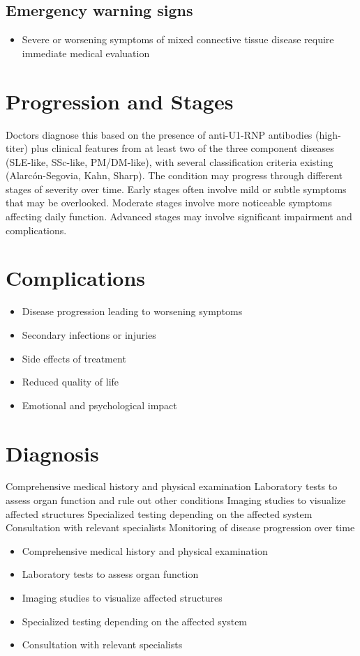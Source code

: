 \subsection{Emergency warning signs}
\begin{itemize}[noitemsep]
  \item Severe or worsening symptoms of mixed connective tissue disease require immediate medical evaluation
\end{itemize}
\section{Progression and Stages}
Doctors diagnose this based on the presence of anti-U1-RNP antibodies (high-titer) plus clinical features from at least two of the three component diseases (SLE-like, SSc-like, PM/DM-like), with several classification criteria existing (Alarcón-Segovia, Kahn, Sharp). The condition may progress through different stages of severity over time. Early stages often involve mild or subtle symptoms that may be overlooked. Moderate stages involve more noticeable symptoms affecting daily function. Advanced stages may involve significant impairment and complications.
\section{Complications}
\begin{itemize}[noitemsep]
  \item Disease progression leading to worsening symptoms
  \item Secondary infections or injuries
  \item Side effects of treatment
  \item Reduced quality of life
  \item Emotional and psychological impact
\end{itemize}
\section{Diagnosis}
Comprehensive medical history and physical examination Laboratory tests to assess organ function and rule out other conditions Imaging studies to visualize affected structures Specialized testing depending on the affected system Consultation with relevant specialists Monitoring of disease progression over time

\begin{itemize}[noitemsep]
  \item Comprehensive medical history and physical examination
  \item Laboratory tests to assess organ function
  \item Imaging studies to visualize affected structures
  \item Specialized testing depending on the affected system
  \item Consultation with relevant specialists
\end{itemize}
